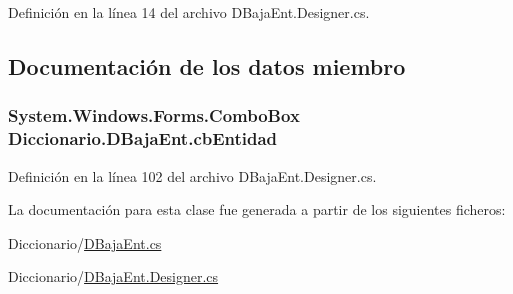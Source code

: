 Definición en la línea 14 del archivo D\-Baja\-Ent.\-Designer.\-cs.



\subsection{Documentación de los datos miembro}
\hypertarget{class_diccionario_1_1_d_baja_ent_a3b31f633d966da43daa526d71adfb578}{
\subsubsection[{cb\-Entidad}]{\setlength{\rightskip}{0pt plus 5cm}System.\-Windows.\-Forms.\-Combo\-Box Diccionario.\-D\-Baja\-Ent.\-cb\-Entidad}}\label{class_diccionario_1_1_d_baja_ent_a3b31f633d966da43daa526d71adfb578}


Definición en la línea 102 del archivo D\-Baja\-Ent.\-Designer.\-cs.



La documentación para esta clase fue generada a partir de los siguientes ficheros\-:\begin{DoxyCompactItemize}
\item 
Diccionario/\hyperlink{_d_baja_ent_8cs}{D\-Baja\-Ent.\-cs}\item 
Diccionario/\hyperlink{_d_baja_ent_8_designer_8cs}{D\-Baja\-Ent.\-Designer.\-cs}\end{DoxyCompactItemize}
